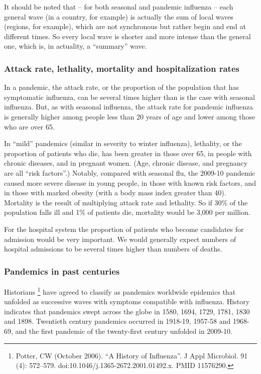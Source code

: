 \documentclass[12pt, a4]{scrartcl}
\begin{document}
It should be noted that – for both seasonal and pandemic influenza – each general wave (in a country, for example) is actually the sum of local waves (regions, for example), which are not synchronous but rather begin and end at different times. So every local wave is shorter and more intense than the general one, which is, in actuality, a “summary” wave.

\subsubsection {Attack rate, lethality, mortality and hospitalization rates}

In a pandemic, the attack rate, or the proportion of the population that has symptomatic influenza, can be several times higher than is the case with seasonal influenza. But, as with seasonal influenza, the attack rate for pandemic influenza is generally higher among people less than 20 years of age and lower among those who are over 65.

In “mild” pandemics (similar in severity to winter influenza), lethality, or the proportion of patients who die, has been greater in those over 65, in people with chronic diseases, and in pregnant women. (Age, chronic disease, and pregnancy are all “risk factors”.) Notably, compared with seasonal flu, the 2009-10 pandemic caused more severe disease in young people, in those with known risk factors, and in those with marked obesity (with a body mass index greater than 40). Mortality is the result of multiplying attack rate and lethality. So if 30\% of the population falls ill and 1\% of patients die, mortality would be 3,000 per million.

For the hospital system the proportion of patients who become candidates for admission would be very important. We would generally expect numbers of hospital admissions to be several times higher than numbers of deaths.

\subsubsection {Pandemics in past centuries}
Historians \footnote{Potter, CW (October 2006). “A History of Influenza”. J Appl Microbiol. 91 (4): 572–579. doi:10.1046/j.1365-2672.2001.01492.x. PMID 11576290.} have agreed to classify as pandemics worldwide epidemics that unfolded as successive waves with symptoms compatible with influenza. History indicates that pandemics swept across the globe in 1580, 1694, 1729, 1781, 1830 and 1898. Twentieth century pandemics occurred in 1918-19, 1957-58 and 1968-69, and the first pandemic of the twenty-first century unfolded in 2009-10.
\end{document}
